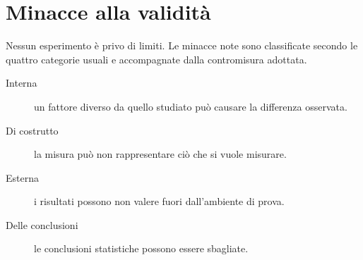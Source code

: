 \chapter{Minacce alla validità}
\label{cap:validita}

Nessun esperimento è privo di limiti. Le minacce note sono classificate secondo le quattro categorie usuali e accompagnate dalla contromisura adottata.

\begin{description}
  \item[Interna] un fattore diverso da quello studiato può causare la differenza osservata.
  \item[Di costrutto] la misura può non rappresentare ciò che si vuole misurare.
  \item[Esterna] i risultati possono non valere fuori dall'ambiente di prova.
  \item[Delle conclusioni] le conclusioni statistiche possono essere sbagliate.
\end{description}


